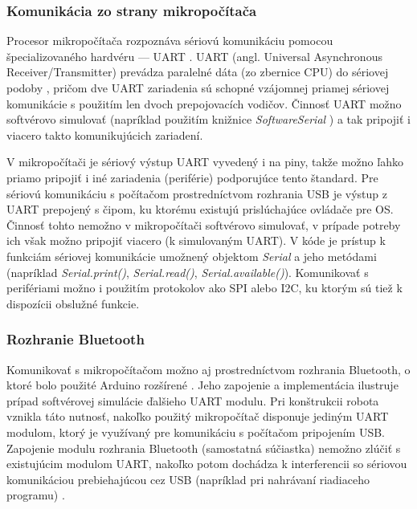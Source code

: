 \subsubsection{Komunikácia zo strany mikropočítača}
Procesor mikropočítača rozpoznáva sériovú komunikáciu pomocou špecializovaného hardvéru --- UART \cite{sketchUpload}. UART (angl. Universal Asynchronous Receiver/Transmitter) prevádza paralelné dáta (zo zbernice CPU) do sériovej podoby \cite{uart}, pričom dve UART zariadenia sú schopné vzájomnej priamej sériovej komunikácie s použitím len dvoch prepojovacích vodičov. Činnosť UART možno softvérovo simulovať (napríklad použitím knižnice \textit{SoftwareSerial} \cite{arduinoSoftwareSerial}) a tak pripojiť i viacero takto komunikujúcich zariadení.

V mikropočítači je sériový výstup UART vyvedený i na piny, takže možno ľahko priamo pripojiť i iné zariadenia (periférie) podporujúce tento štandard. Pre sériovú komunikáciu s počítačom prostredníctvom rozhrania USB je výstup z UART prepojený s  čipom, ku ktorému existujú prislúchajúce ovládače pre OS. Činnosť tohto  nemožno v mikropočítači softvérovo simulovať, v prípade potreby ich však možno pripojiť viacero (k simulovaným UART). V kóde je prístup k funkciám sériovej komunikácie umožnený objektom \textit{Serial} a jeho metódami (napríklad \textit{Serial.print()}, \textit{Serial.read()}, \textit{Serial.available()}). Komunikovať s perifériami možno i použitím protokolov ako SPI alebo I2C, ku ktorým sú tiež k dispozícii obslužné funkcie.

\subsubsection{Rozhranie Bluetooth}
Komunikovať s mikropočítačom možno aj prostredníctvom rozhrania Bluetooth, o ktoré bolo použité Arduino rozšírené \cite{PetrovicVaskoOtto}. Jeho zapojenie a implementácia ilustruje prípad softvérovej simulácie ďalšieho UART modulu. Pri konštrukcii robota vznikla táto nutnosť, nakoľko použitý mikropočítač disponuje jediným UART modulom, ktorý je využívaný pre komunikáciu s počítačom pripojením USB. Zapojenie modulu rozhrania Bluetooth (samostatná súčiastka) nemožno zlúčiť s existujúcim modulom UART, nakoľko potom dochádza k interferencii so sériovou komunikáciou prebiehajúcou cez USB (napríklad pri nahrávaní riadiaceho programu) \cite{PetrovicVaskoOtto}.


